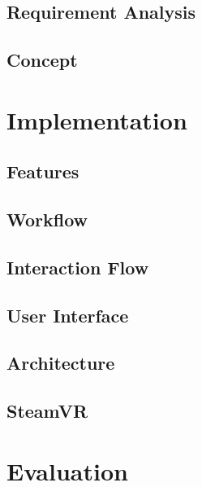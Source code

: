\documentclass[twoside, parskip]{VRThesis} %
\begin{document}
\section{\label{sec::RequirementAnalysis}Requirement Analysis}

\section{\label{sec::Concept}Concept}


\chapter{\label{chap::Implementation}Implementation}

\section{\label{sec::Features}Features}

\section{\label{sec::Workflow}Workflow}

\section{\label{sec::InteractionFlow}Interaction Flow}

\section{\label{sec::UserInterface}User Interface}

\section{\label{sec::Architecture}Architecture}

\section{\label{sec::SteamVR}SteamVR}


\chapter{\label{chap::Evaluation}Evaluation}

\end{document}
